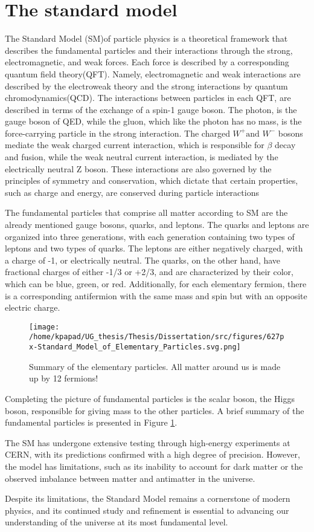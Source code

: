 \section{The standard model}
\label{sec:org8632faf}

The Standard Model (SM)of particle physics is a theoretical framework that describes the fundamental particles and their interactions through the strong, electromagnetic, and weak forces. Each force is described by a corresponding quantum field theory(QFT). Namely, electromagnetic and weak interactions are described by the electroweak theory and the strong interactions by quantum chromodynamics(QCD). The interactions between particles in each QFT, are described in terms of the exchange of a spin-1 gauge boson. The photon, is the gauge boson of QED, while the gluon, which like the photon has no mass, is the force-carrying particle in the strong interaction. The charged \(W^{+} \text{and }W^{-}\) bosons mediate the weak charged current interaction, which is responsible for \(\beta\) decay and fusion, while the weak neutral current interaction, is mediated by the electrically neutral Z boson. These interactions are also governed by the principles of symmetry and conservation, which dictate that certain properties, such as charge and energy, are conserved during particle interactions

The fundamental particles that comprise all matter according to SM are the already mentioned gauge bosons, quarks, and leptons. The quarks and leptons are organized into three generations, with each generation containing two types of leptons and two types of quarks. The leptons are either negatively charged, with a charge of -1, or electrically neutral. The quarks, on the other hand, have fractional charges of either -1/3 or +2/3, and are characterized by their color, which can be blue, green, or red. Additionally, for each elementary fermion, there is a corresponding antifermion with the same mass and spin but with an opposite electric charge.
\begin{figure}[ht]
\centering
\texttt{[image: /home/kpapad/UG\_thesis/Thesis/Dissertation/src/figures/627px-Standard\_Model\_of\_Elementary\_Particles.svg.png]}
\caption{Summary of the elementary particles. All matter around us is made up by 12 fermions!}
\label{fig:particles}
\end{figure}


Completing the picture of fundamental particles is the scalar boson, the Higgs boson, responsible for giving mass to the other particles. A brief summary of the fundamental particles is presented in Figure \ref{fig:particles}.

The SM has undergone extensive testing through high-energy experiments at CERN, with its predictions confirmed with a high degree of precision. However, the model has limitations, such as its inability to account for dark matter or the observed imbalance between matter and antimatter in the universe.

Despite its limitations, the Standard Model remains a cornerstone of modern physics, and its continued study and refinement is essential to advancing our understanding of the universe at its most fundamental level.
